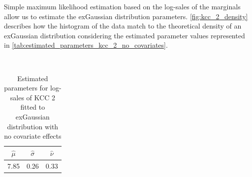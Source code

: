 
Simple maximum likelihood estimation based on the log-sales of the marginals allow us to estimate the exGaussian distribution parameters. \autoref{fig:kcc_2_density} describes how the histogram of the data match to the theoretical density of an exGaussian distribution considering the estimated parameter values represented in \autoref{tab:estimated_parameters_kcc_2_no_covariates}.
\\




\begin{table}[H]
\setlength\arrayrulewidth{1pt}  
\centering
\begin{adjustbox}{max width=\textwidth}\
\begin{tabular}{|c|c|c|}
\hline
\rowcolor{lightgray} 
$\hat{\mu}$ & $\hat{\sigma}$ & $\hat{\nu}$ \\ \hline
7.85        & 0.26           & 0.33        \\ \hline
\end{tabular}
\end{adjustbox}
\caption{Estimated parameters for log-sales of KCC 2 fitted to exGaussian distribution with no covariate effects}
\label{tab:estimated_parameters_kcc_2_no_covariates}
\end{table}





